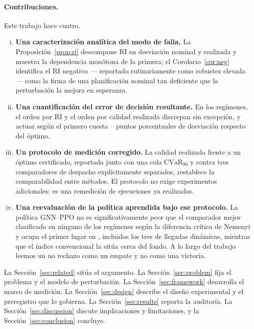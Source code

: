 \documentclass[a4paper,fleqn]{cas-sc}
\newcommand{\RI}{\mathrm{RI}}
\newcommand{\CVaR}{\mathrm{CVaR}}
\begin{document}
\paragraph{Contribuciones.} Este trabajo hace cuatro.
\begin{enumerate}[(i)]
\item \textbf{Una caracterización analítica del modo de falla.} La
Proposición~\ref{prop:ri} descompone $\RI$ en desviación nominal y realizada y
muestra la dependencia monótona de la primera; el
Corolario~\ref{cor:neg} identifica el $\RI$ negativo --- reportado
rutinariamente como robustez elevada --- como la firma de una planificación
nominal tan deficiente que la perturbación la mejora en esperanza.
\item \textbf{Una cuantificación del error de decisión resultante.} En los
\NRegimes{} regímenes, el orden por $\RI$ y el orden por calidad realizada
discrepan sin excepción, y actuar según el primero cuesta
\PenaltyMin{}--\PenaltyMax{} puntos porcentuales de desviación respecto del
óptimo.
\item \textbf{Un protocolo de medición corregido.} La calidad realizada frente a
un óptimo certificado, reportada junto con una cola $\CVaR_{90}$ y contra tres
comparadores de despacho explícitamente separados, restablece la comparabilidad
entre métodos. El protocolo no exige experimentos adicionales: es una remedición
de ejecuciones ya realizadas.
\item \textbf{Una reevaluación de la política aprendida bajo ese protocolo.} La
política GNN--PPO no es significativamente peor que el comparador mejor
clasificado en ninguno de los \NRegimes{} regímenes según la diferencia crítica
de Nemenyi y ocupa el primer lugar en \NRLBest{}, incluidos los tres de llegadas
dinámicas, mientras que el índice convencional la sitúa cerca del fondo. A lo
largo del trabajo leemos un no rechazo como un empate y no como una victoria.
\end{enumerate}

La Sección~\ref{sec:related} sitúa el argumento. La Sección~\ref{sec:problem}
fija el problema y el modelo de perturbación. La Sección~\ref{sec:framework}
desarrolla el marco de medición. La Sección~\ref{sec:design} describe el diseño
experimental y el preregistro que lo gobierna. La Sección~\ref{sec:results}
reporta la auditoría. La Sección~\ref{sec:discussion} discute implicaciones y
limitaciones, y la Sección~\ref{sec:conclusion} concluye.

\end{document}
